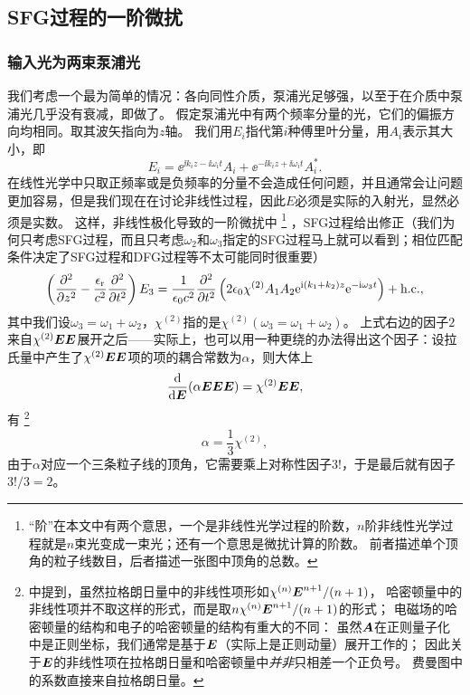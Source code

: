 \subsection{SFG过程的一阶微扰}

\subsubsection{输入光为两束泵浦光}

我们考虑一个最为简单的情况：各向同性介质，泵浦光足够强，以至于在介质中泵浦光几乎没有衰减，即做了。
假定泵浦光中有两个频率分量的光，它们的偏振方向均相同。取其波矢指向为$z$轴。
我们用$E_i$指代第$i$种傅里叶分量，用$A_i$表示其大小，即
\[
    E_i = \ee^{\ii k_i z - \ii \omega_i t} A_i + \ee^{- \ii k_i z + \ii \omega_i t} A_i^*.
\]
在线性光学中只取正频率或是负频率的分量不会造成任何问题，并且通常会让问题更加容易，但是我们现在在讨论非线性过程，因此$E$必须是实际的入射光，显然必须是实数。
这样，非线性极化导致的一阶微扰中%
\footnote{
    “阶”在本文中有两个意思，一个是非线性光学过程的阶数，$n$阶非线性光学过程就是$n$束光变成一束光；还有一个意思是微扰计算的阶数。
    前者描述单个顶角的粒子线数目，后者描述一张图中顶角的总数。
}%
，SFG过程给出修正（我们为何只考虑SFG过程，而且只考虑$\omega_2$和$\omega_3$指定的SFG过程马上就可以看到；相位匹配条件决定了SFG过程和DFG过程等不太可能同时很重要）
\[
    \left( \pdv[2]{z} - \frac{\epsilon_\text{r}}{c^2} \pdv[2]{t} \right) E_3 = \frac{1}{\epsilon_0 c^2} \pdv[2]{t} \left( 2 \epsilon_0  \chi^{(2)} A_1 A_2 \mathrm{e}^{\mathrm{i} (k_1 + k_2) z} \mathrm{e}^{-\mathrm{i} \omega_3 t} \right) + \text{h.c.},
\]
其中我们设$\omega_3 = \omega_1 + \omega_2$，$\chi^{(2)}$指的是$\chi^{(2)}(\omega_3=\omega_1+\omega_2)$。
上式右边的因子$2$来自$\chi^{(2)} \vb*{E} \vb*{E}$展开之后——实际上，也可以用一种更绕的办法得出这个因子：设拉氏量中产生了$\chi^{(2)} \vb*{E} \vb*{E}$项的项的耦合常数为$\alpha$，则大体上
\[
    \dv{\vb*{E}} (\alpha \vb*{E} \vb*{E} \vb*{E}) = \chi^{(2)} \vb*{E} \vb*{E},
\]
有%
\footnote{
    \cite{drummond_hillery_2014}中提到，虽然拉格朗日量中的非线性项形如$\chi^{(n)} \vb*{E}^{n+1} / (n + 1)$，
    哈密顿量中的非线性项并不取这样的形式，而是取$n \chi^{(n)} \vb*{E}^{n+1} / (n + 1)$的形式；
    电磁场的哈密顿量的结构和电子的哈密顿量的结构有重大的不同：
    虽然$\vb*{A}$在正则量子化中是正则坐标，我们通常是基于$\vb*{E}$（实际上是正则动量）展开工作的；
    因此关于$\vb*{E}$的非线性项在拉格朗日量和哈密顿量中\emph{并非}只相差一个正负号。
    费曼图中的系数直接来自拉格朗日量。
}
\[
    \alpha = \frac{1}{3} \chi^{(2)},
\]
由于$\alpha$对应一个三条粒子线的顶角，它需要乘上对称性因子$3!$，于是最后就有因子$3! / 3 = 2$。
